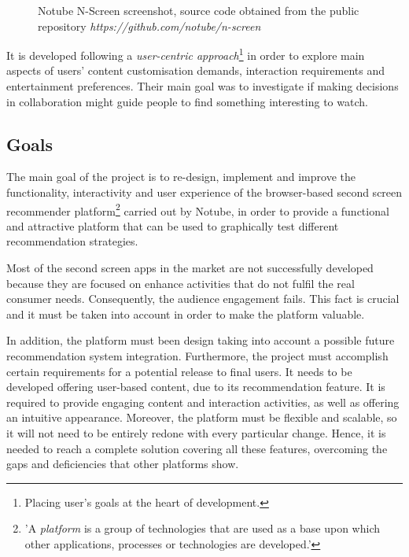 \documentclass{acm_proc_article-sp}
\begin{document}
\begin{figure}[!htb]
	\centering
	\caption{Notube N-Screen screenshot, source code obtained from the public repository \textit{https://github.com/notube/n-screen}}
	\label{fig:oldnotubenscreen}
\end{figure}

It is developed following a \textit{user-centric approach}\footnote{Placing user's goals at the heart of development.} in order to explore main aspects of users' content customisation demands, interaction requirements and entertainment preferences. Their main goal was to investigate if making decisions in collaboration might guide people to find something interesting to watch. 

\subsection{Goals}

The main goal of the project is to re-design, implement and improve the functionality, interactivity and user experience of the browser-based second screen recommender platform\cite{tech:platform}\footnote{'A \textit{platform} is a group of technologies that are used as a base upon which other applications, processes or technologies are developed.'} carried out by Notube, in order to provide a functional and attractive platform that can be used to graphically test different recommendation strategies. 

Most of the second screen apps in the market are not successfully developed because they are focused on enhance activities  that do not fulfil the real consumer needs\cite{evolumedia1}. Consequently, the audience engagement fails. This fact is crucial and it must be taken into account in order to make the platform valuable.

In addition, the platform must been design taking into account a possible future recommendation system integration. Furthermore, the project must accomplish certain requirements for a potential release to final users. It needs to be developed offering user-based content, due to its recommendation feature. It is required to provide engaging content and interaction activities, as well as offering an intuitive appearance. Moreover, the platform must be flexible and scalable, so it will not need to be entirely redone with every particular change. Hence, it is needed to reach a complete solution covering all these features, overcoming the gaps and deficiencies that other platforms show.
\end{document}
